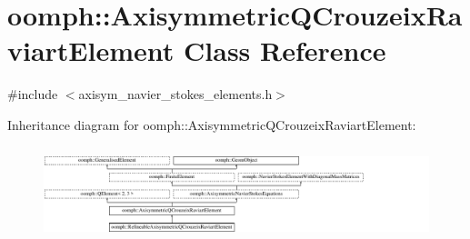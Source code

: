 \hypertarget{classoomph_1_1AxisymmetricQCrouzeixRaviartElement}{}\section{oomph\+:\+:Axisymmetric\+Q\+Crouzeix\+Raviart\+Element Class Reference}
\label{classoomph_1_1AxisymmetricQCrouzeixRaviartElement}


{\ttfamily \#include $<$axisym\+\_\+navier\+\_\+stokes\+\_\+elements.\+h$>$}

Inheritance diagram for oomph\+:\+:Axisymmetric\+Q\+Crouzeix\+Raviart\+Element\+:\begin{figure}[H]
\begin{center}
\leavevmode
\includegraphics[height=2.737048cm]{classoomph_1_1AxisymmetricQCrouzeixRaviartElement}
\end{center}
\end{figure}
